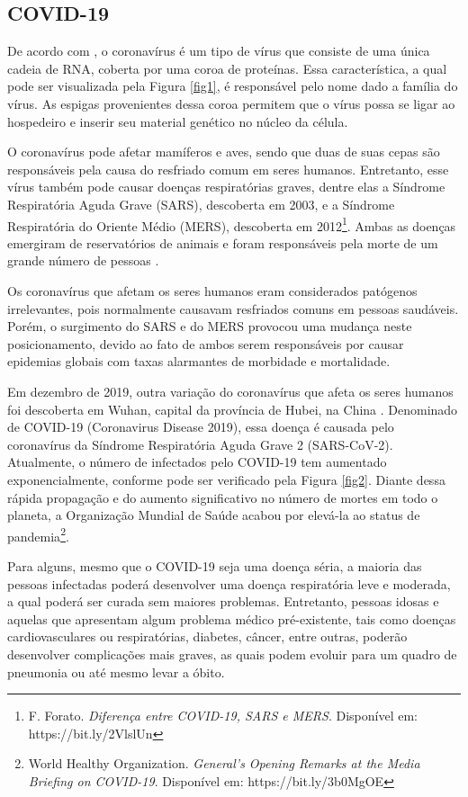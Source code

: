 \documentclass{ieeeaccess}
\begin{document}
\subsection{COVID-19}

De acordo com \cite{b2}, o coronavírus é um tipo de vírus que consiste de uma única cadeia de RNA, coberta por uma coroa de proteínas. Essa característica, a qual pode ser visualizada pela Figura \ref{fig1}, é responsável pelo nome dado a família do vírus. As espigas provenientes dessa coroa permitem que o vírus possa se ligar ao hospedeiro e inserir seu material genético no núcleo da célula. 

O coronavírus pode afetar mamíferos e aves, sendo que duas de suas cepas são responsáveis pela causa do resfriado comum em seres humanos. Entretanto, esse vírus também pode causar doenças respiratórias graves, dentre elas a Síndrome Respiratória Aguda Grave (SARS), descoberta em 2003, e a Síndrome Respiratória do Oriente Médio (MERS), descoberta em 2012\footnote{F. Forato. \textit{Diferença entre COVID-19, SARS e MERS}. Disponível em: https://bit.ly/2VlslUn}. Ambas as doenças emergiram de reservatórios de animais e foram responsáveis pela morte de um grande número de pessoas \cite{b8}.

Os coronavírus que afetam os seres humanos eram considerados patógenos irrelevantes, pois normalmente causavam resfriados comuns em pessoas saudáveis. Porém, o surgimento do SARS e do MERS provocou uma mudança neste posicionamento, devido ao fato de ambos serem responsáveis por causar epidemias globais com taxas alarmantes de morbidade e mortalidade. 

Em dezembro de 2019, outra variação do coronavírus que afeta os seres humanos foi descoberta em Wuhan, capital da província de Hubei, na China \cite{b8}. Denominado de COVID-19 (Coronavirus Disease 2019), essa doença é causada pelo coronavírus da Síndrome Respiratória Aguda Grave 2 (SARS-CoV-2). Atualmente, o número de infectados pelo COVID-19 tem aumentado exponencialmente, conforme pode ser verificado pela Figura \ref{fig2}. Diante dessa rápida propagação e do aumento significativo no número de mortes em todo o planeta,  a Organização Mundial de Saúde acabou por elevá-la ao status de pandemia\footnote{World Healthy Organization. \textit{General's Opening Remarks at the Media Briefing on COVID-19}. Disponível em: https://bit.ly/3b0MgOE}.

Para alguns, mesmo que o COVID-19 seja uma doença séria, a maioria das pessoas infectadas poderá desenvolver uma doença respiratória leve e moderada, a qual poderá ser curada sem maiores problemas. Entretanto, pessoas idosas e aquelas que apresentam algum problema médico pré-existente, tais como doenças cardiovasculares ou respiratórias, diabetes, câncer, entre outras, poderão desenvolver complicações mais graves, as quais podem evoluir para um quadro de pneumonia ou até mesmo levar a óbito. 
\end{document}
